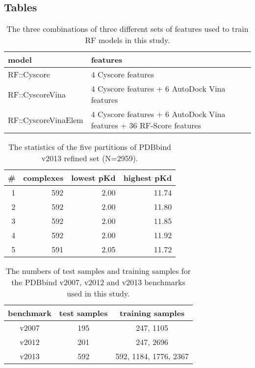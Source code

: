 \documentclass[linenumbers]{bmcart}
\begin{document}
\begin{backmatter}

\section*{Tables}

\begin{table}[ht]
\caption{The three combinations of three different sets of features used to train RF models in this study.}
\label{tbl:features}
\begin{tabular}{ll}
\hline
model & features\\
\hline
RF::Cyscore         & 4 Cyscore features\\
RF::CyscoreVina     & 4 Cyscore features + 6 AutoDock Vina features\\
RF::CyscoreVinaElem & 4 Cyscore features + 6 AutoDock Vina features + 36 RF-Score features\\
\hline
\end{tabular}
\end{table}

\begin{table}[ht]
\caption{The statistics of the five partitions of PDBbind v2013 refined set (N=2959).}
\label{tbl:partitions}
\begin{tabular}{rrrr}
\hline
\# & complexes & lowest pKd & highest pKd\\
\hline
1 & 592 & 2.00 & 11.74\\
2 & 592 & 2.00 & 11.80\\
3 & 592 & 2.00 & 11.85\\
4 & 592 & 2.00 & 11.92\\
5 & 591 & 2.05 & 11.72\\
\hline
\end{tabular}
\end{table}

\begin{table}[ht]
\caption{The numbers of test samples and training samples for the PDBbind v2007, v2012 and v2013 benchmarks used in this study.}
\label{tbl:benchmarks}
\begin{tabular}{ccc}
\hline
benchmark & test samples & training samples\\
\hline
v2007 & 195 & 247, 1105\\
v2012 & 201 & 247, 2696\\
v2013 & 592 & 592, 1184, 1776, 2367\\
\hline
\end{tabular}
\end{table}


\end{backmatter}
\end{document}
